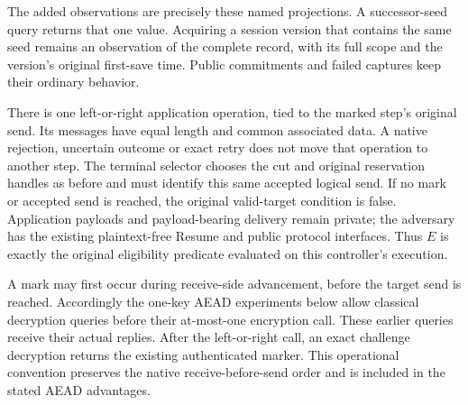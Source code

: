 The added observations are precisely these named projections. A
successor-seed query returns that one value. Acquiring a session version
that contains the same seed remains an observation of the complete record, with
its full scope and the version's original first-save time. Public
commitments and failed captures keep their ordinary behavior.

There is one left-or-right application operation, tied to the marked
step's original send. Its messages have equal length and common
associated data. A native rejection, uncertain outcome or exact retry
does not move that operation to another step. The terminal selector
chooses the cut and original reservation handles as before and must
identify this same accepted logical send. If no mark or accepted send
is reached, the original valid-target condition is false. Application
payloads and payload-bearing delivery remain private; the adversary
has the existing plaintext-free Resume and public protocol interfaces.
Thus $E$ is exactly the original eligibility predicate evaluated on
this controller's execution.

A mark may first occur during receive-side advancement, before the
target send is reached. Accordingly the one-key AEAD experiments below
allow classical decryption queries before their at-most-one encryption
call. These earlier queries receive their actual replies. After the
left-or-right call, an exact challenge decryption returns the existing
authenticated marker. This operational convention preserves the
native receive-before-send order and is included in the stated AEAD
advantages.

